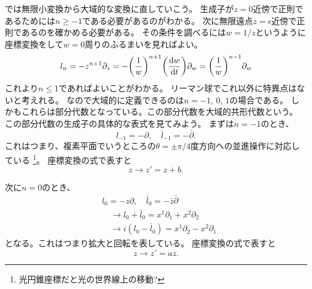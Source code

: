 \documentclass[../../master.tex]{subfiles}
\begin{document}
では無限小変換から大域的な変換に直していこう。
生成子が\(z=0\)近傍で正則であるためには\(n\geq -1\)である必要があるのがわかる。
次に無限遠点\(z=\epsilon\)近傍で正則であるのを確かめる必要がある。
その条件を調べるには\(w=1/z\)というように座標変換をして\(w=0\)周りのふるまいを見ればよい。
\begin{equation}
    l_n = -z^{n+1}\partial_z = -\qty(\frac{1}{w})^{n+1}\qty(\dv{w}{t})\partial_w = \qty(\frac{1}{w})^{n-1}\partial_w
\end{equation}
これより\(n\leq 1\)であればよいことがわかる。
リーマン球でこれ以外に特異点はないと考えれる。
なので大域的に定義できるのは\(n=-1,\,0,\,1\)の場合である。
しかもこれらは部分代数となっている。この部分代数を大域的共形代数という。
この部分代数の生成子の具体的な表式を見てみよう。
まずは\(n=-1\)のとき、
\begin{equation*}
    l_{-1} = -\partial,\quad \bar{l}_{-1} = -\bar{\partial}.
\end{equation*}
これはつまり、複素平面でいうところの\(\theta=\pm \pi/4\)度方向への並進操作に対応している
\footnote{光円錐座標だと光の世界線上の移動?}。
座標変換の式で表すと
\begin{equation*}
    z\rightarrow z' = z + b.
\end{equation*}

次に\(n=0\)のとき、
\begin{align*}
    &l_0 = -z\partial,\quad \bar{l}_0 = -\bar{z}\bar{\partial}\\
    &\quad \rightarrow l_0 + \bar{l}_0 = x^1\partial_1 + x^2\partial_2\\
    &\quad \rightarrow i(l_0-\bar{l}_0) = x^1\partial_2 -x^2\partial_1
\end{align*}
となる。これはつまり拡大と回転を表している。
座標変換の式で表すと
\begin{equation*}
    z\rightarrow z'= az.
\end{equation*}
\end{document}
